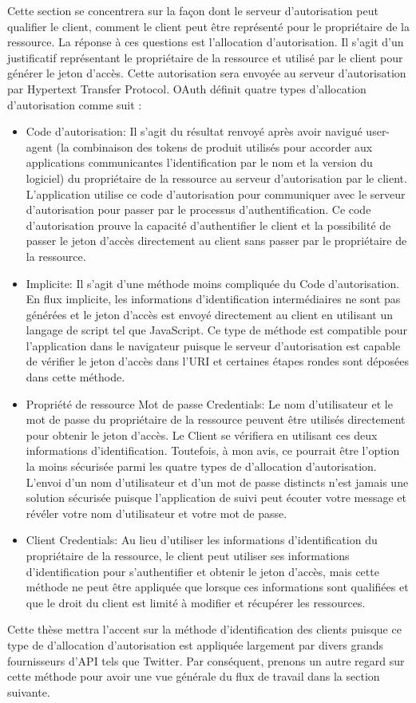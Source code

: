 Cette section se concentrera sur la façon dont le serveur d'autorisation peut qualifier le client, comment le client peut être représenté pour le propriétaire de la ressource. La réponse à ces questions est l'allocation d'autorisation. Il s'agit d'un justificatif représentant le propriétaire de la ressource et utilisé par le client pour générer le jeton d'accès. Cette autorisation sera envoyée au serveur d'autorisation par Hypertext Transfer Protocol. OAuth définit quatre types d'allocation d'autorisation comme suit \cite{4}:
\begin{itemize}
\item Code d'autorisation: Il s'agit du résultat renvoyé après avoir navigué user-agent (la combinaison des tokens de produit utilisés pour accorder aux applications communicantes l'identification par le nom et la version du logiciel) du propriétaire de la ressource au serveur d'autorisation par le client. L'application utilise ce code d'autorisation pour communiquer avec le serveur d'autorisation pour passer par le processus d'authentification. Ce code d'autorisation prouve la capacité d'authentifier le client et la possibilité de passer le jeton d'accès directement au client sans passer par le propriétaire de la ressource.
\item Implicite: Il s'agit d'une méthode moins compliquée du Code d'autorisation. En flux implicite, les informations d'identification intermédiaires ne sont pas générées et le jeton d'accès est envoyé directement au client en utilisant un langage de script tel que JavaScript. Ce type de méthode est compatible pour l'application dans le navigateur puisque le serveur d'autorisation est capable de vérifier le jeton d'accès dans l'URI et certaines étapes rondes sont déposées dans cette méthode.
\item Propriété de ressource Mot de passe Credentials: Le nom d'utilisateur et le mot de passe du propriétaire de la ressource peuvent être utilisés directement pour obtenir le jeton d'accès. Le Client se vérifiera en utilisant ces deux informations d'identification. Toutefois, à mon avis, ce pourrait être l'option la moins sécurisée parmi les quatre types de d'allocation d'autorisation. L'envoi d'un nom d'utilisateur et d'un mot de passe distincts n'est jamais une solution sécurisée puisque l'application de suivi peut écouter votre message et révéler votre nom d'utilisateur et votre mot de passe.
\item Client Credentials: Au lieu d'utiliser les informations d'identification du propriétaire de la ressource, le client peut utiliser ses informations d'identification pour s'authentifier et obtenir le jeton d'accès, mais cette méthode ne peut être appliquée que lorsque ces informations sont qualifiées et que le droit du client est limité à modifier et récupérer les ressources.
\end{itemize}
Cette thèse mettra l'accent sur la méthode d'identification des clients puisque ce type de d'allocation d'autorisation est appliquée largement par divers grands fournisseurs d'API tels que Twitter. Par conséquent, prenons un autre regard sur cette méthode pour avoir une vue générale du flux de travail dans la section suivante.

